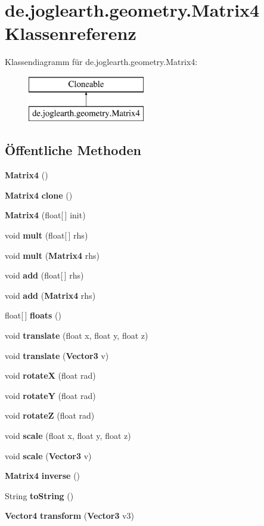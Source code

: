 \section{de.\-joglearth.\-geometry.\-Matrix4 Klassenreferenz}
\label{classde_1_1joglearth_1_1geometry_1_1_matrix4}
Klassendiagramm für de.\-joglearth.\-geometry.\-Matrix4\-:\begin{figure}[H]
\begin{center}
\leavevmode
\includegraphics[height=2.000000cm]{classde_1_1joglearth_1_1geometry_1_1_matrix4}
\end{center}
\end{figure}
\subsection*{Öffentliche Methoden}
\begin{DoxyCompactItemize}
\item 
{\bf Matrix4} ()
\item 
{\bf Matrix4} {\bf clone} ()
\item 
{\bf Matrix4} (float[$\,$] init)
\item 
void {\bf mult} (float[$\,$] rhs)
\item 
void {\bf mult} ({\bf Matrix4} rhs)
\item 
void {\bf add} (float[$\,$] rhs)
\item 
void {\bf add} ({\bf Matrix4} rhs)
\item 
float[$\,$] {\bf floats} ()
\item 
void {\bf translate} (float x, float y, float z)
\item 
void {\bf translate} ({\bf Vector3} v)
\item 
void {\bf rotate\-X} (float rad)
\item 
void {\bf rotate\-Y} (float rad)
\item 
void {\bf rotate\-Z} (float rad)
\item 
void {\bf scale} (float x, float y, float z)
\item 
void {\bf scale} ({\bf Vector3} v)
\item 
{\bf Matrix4} {\bf inverse} ()
\item 
String {\bf to\-String} ()
\item 
{\bf Vector4} {\bf transform} ({\bf Vector3} v3)
\end{DoxyCompactItemize}


